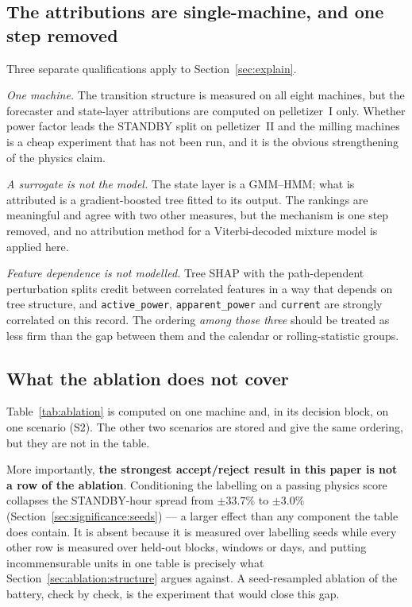 \subsection{The attributions are single-machine, and one step removed}
\label{sec:limitations:attribution}

Three separate qualifications apply to Section~\ref{sec:explain}.

\emph{One machine.} The transition structure is measured on all eight
machines, but the forecaster and state-layer attributions are computed
on pelletizer~I only. Whether power factor leads the STANDBY split on
pelletizer~II and the milling machines is a cheap experiment that has
not been run, and it is the obvious strengthening of the physics claim.

\emph{A surrogate is not the model.} The state layer is a GMM--HMM;
what is attributed is a gradient-boosted tree fitted to its output. The
rankings are meaningful and agree with two other measures, but the
mechanism is one step removed, and no attribution method for a
Viterbi-decoded mixture model is applied here.

\emph{Feature dependence is not modelled.} Tree SHAP with the
path-dependent perturbation splits credit between correlated features in
a way that depends on tree structure, and \texttt{active\_power},
\texttt{apparent\_power} and \texttt{current} are strongly correlated on
this record. The ordering \emph{among those three} should be treated as
less firm than the gap between them and the calendar or
rolling-statistic groups.

\subsection{What the ablation does not cover}
\label{sec:limitations:ablation}

Table~\ref{tab:ablation} is computed on one machine and, in its decision
block, on one scenario (S2). The other two scenarios are stored and give
the same ordering, but they are not in the table.

More importantly, \textbf{the strongest accept/reject result in this
paper is not a row of the ablation}. Conditioning the labelling on a
passing physics score collapses the STANDBY-hour spread from $\pm33.7\%$
to $\pm3.0\%$ (Section~\ref{sec:significance:seeds}) --- a larger effect
than any component the table does contain. It is absent because it is
measured over labelling seeds while every other row is measured over
held-out blocks, windows or days, and putting incommensurable units in
one table is precisely what Section~\ref{sec:ablation:structure} argues
against. A seed-resampled ablation of the battery, check by check, is
the experiment that would close this gap.

